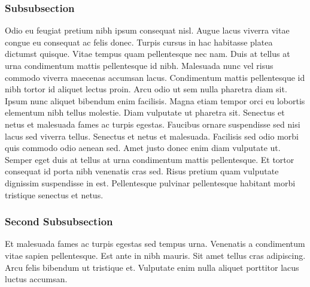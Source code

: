 \subsubsection{Subsubsection}

Odio eu feugiat pretium nibh ipsum consequat nisl. Augue lacus viverra vitae
congue eu consequat ac felis donec. Turpis cursus in hac habitasse platea
dictumst quisque. Vitae tempus quam pellentesque nec nam. Duis at tellus at
urna condimentum mattis pellentesque id nibh. Malesuada nunc vel risus commodo
viverra maecenas accumsan lacus. Condimentum mattis pellentesque id nibh tortor
id aliquet lectus proin. Arcu odio ut sem nulla pharetra diam sit. Ipsum nunc
aliquet bibendum enim facilisis. Magna etiam tempor orci eu lobortis elementum
nibh tellus molestie. Diam vulputate ut pharetra sit. Senectus et netus et
malesuada fames ac turpis egestas. Faucibus ornare suspendisse sed nisi lacus
sed viverra tellus. Senectus et netus et malesuada. Facilisis sed odio morbi
quis commodo odio aenean sed. Amet justo donec enim diam vulputate ut. Semper
eget duis at tellus at urna condimentum mattis pellentesque. Et tortor
consequat id porta nibh venenatis cras sed. Risus pretium quam vulputate
dignissim suspendisse in est. Pellentesque pulvinar pellentesque habitant morbi
tristique senectus et netus.

\subsubsection{Second Subsubsection}

Et malesuada fames ac turpis egestas sed tempus urna. Venenatis a condimentum
vitae sapien pellentesque. Est ante in nibh mauris. Sit amet tellus cras
adipiscing. Arcu felis bibendum ut tristique et. Vulputate enim nulla aliquet
porttitor lacus luctus accumsan. 
